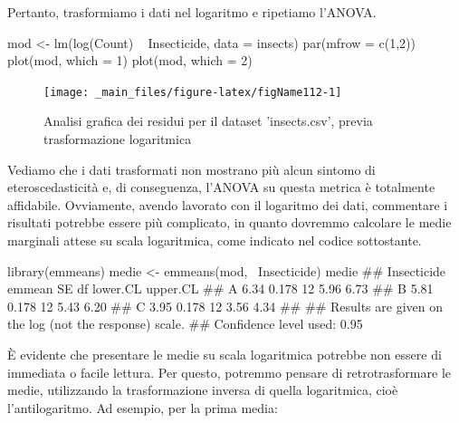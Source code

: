 \documentclass[a4paper,12pt,oneside]{book}
\newenvironment{Shaded}{}{}
\newcommand{\KeywordTok}[1]{#1}
\newcommand{\DataTypeTok}[1]{#1}
\newcommand{\DecValTok}[1]{#1}
\newcommand{\StringTok}[1]{#1}
\newcommand{\CommentTok}[1]{#1}
\newcommand{\OperatorTok}[1]{#1}
\newcommand{\NormalTok}[1]{#1}
\begin{document}
Pertanto, trasformiamo i dati nel logaritmo e ripetiamo l'ANOVA.

\begin{Shaded}
\begin{Highlighting}[]
\NormalTok{mod <-}\StringTok{ }\KeywordTok{lm}\NormalTok{(}\KeywordTok{log}\NormalTok{(Count) }\OperatorTok{~}\StringTok{ }\NormalTok{Insecticide, }\DataTypeTok{data =}\NormalTok{ insects)}
\KeywordTok{par}\NormalTok{(}\DataTypeTok{mfrow =} \KeywordTok{c}\NormalTok{(}\DecValTok{1}\NormalTok{,}\DecValTok{2}\NormalTok{))}
\KeywordTok{plot}\NormalTok{(mod, }\DataTypeTok{which =} \DecValTok{1}\NormalTok{)}
\KeywordTok{plot}\NormalTok{(mod, }\DataTypeTok{which =} \DecValTok{2}\NormalTok{)}
\end{Highlighting}
\end{Shaded}

\begin{figure}

{\centering \texttt{[image: \_main\_files/figure-latex/figName112-1]} 

}

\caption{Analisi grafica dei residui per il dataset 'insects.csv', previa trasformazione logaritmica}\label{fig:figName112}
\end{figure}

Vediamo che i dati trasformati non mostrano più alcun sintomo di eteroscedasticità e, di conseguenza, l'ANOVA su questa metrica è totalmente affidabile. Ovviamente, avendo lavorato con il logaritmo dei dati, commentare i risultati potrebbe essere più complicato, in quanto dovremmo calcolare le medie marginali attese su scala logaritmica, come indicato nel codice sottostante.

\begin{Shaded}
\begin{Highlighting}[]
\KeywordTok{library}\NormalTok{(emmeans)}
\NormalTok{medie <-}\StringTok{ }\KeywordTok{emmeans}\NormalTok{(mod, }\OperatorTok{~}\NormalTok{Insecticide)}
\NormalTok{medie}
\CommentTok{##  Insecticide emmean    SE df lower.CL upper.CL}
\CommentTok{##  A             6.34 0.178 12     5.96     6.73}
\CommentTok{##  B             5.81 0.178 12     5.43     6.20}
\CommentTok{##  C             3.95 0.178 12     3.56     4.34}
\CommentTok{## }
\CommentTok{## Results are given on the log (not the response) scale. }
\CommentTok{## Confidence level used: 0.95}
\end{Highlighting}
\end{Shaded}

È evidente che presentare le medie su scala logaritmica potrebbe non essere di immediata o facile lettura. Per questo, potremmo pensare di retrotrasformare le medie, utilizzando la trasformazione inversa di quella logaritmica, cioè l'antilogaritmo. Ad esempio, per la prima media:
\end{document}
